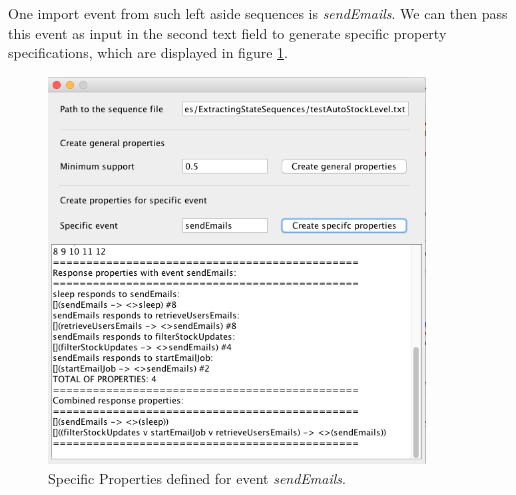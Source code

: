 One import event from such left aside sequences is \textit{sendEmails}. We can then pass this event as input in the second text field to generate specific property specifications, which are displayed in figure \ref{fig:propGenTool_3}.

\begin{figure}[htb]
\centering
\includegraphics[width=10cm]{figuras/propGenTool_3}
\caption{\label{fig:propGenTool_3} Specific Properties defined for event \textit{sendEmails}.}
\end{figure}

